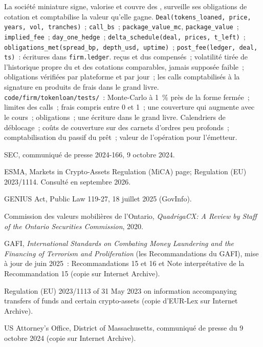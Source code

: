 \begin{build}
 La société miniature signe, valorise et couvre des , surveille ses obligations de cotation et comptabilise la valeur qu'elle gagne.
 \texttt{Deal(tokens\_loaned, price, years, vol, tranches)}~; \texttt{call\_bs}~; \texttt{package\_value\_mc}, \texttt{package\_value}~;
\texttt{implied\_fee}~; \texttt{day\_one\_hedge}~; \texttt{delta\_schedule(deal, prices, t\_left)}~; \texttt{obligations\_met(spread\_bp, depth\_usd, uptime)}~;
\texttt{post\_fee(ledger, deal, ts)}~: écritures dans \texttt{firm.ledger}.
  reçus et dus compensés~; volatilité tirée de l'historique propre du  et des cotations comparables, jamais supposée faible~; obligations vérifiées par plateforme
et par jour~; les calls comptabilisés à la signature en produits de frais dans le grand livre.
 \texttt{code/firm/tokenloan/tests/}~: Monte-Carlo à 1~\% près de la forme fermée~; limites des calls~; frais compris entre 0 et 1~; une couverture qui augmente avec le
cours~; obligations~; une écriture dans le grand livre.
 Calendriers de déblocage~; coûts de couverture sur des carnets d'ordres peu profonds~; comptabilisation du passif du prêt~; valeur de l'opération pour l'émetteur.
\end{build}

\begin{omsources}
\item SEC, communiqué de presse 2024-166, 9 octobre 2024.
\item ESMA, Markets in Crypto-Assets Regulation (MiCA) page; Regulation (EU) 2023/1114. Consulté en septembre 2026.
\item GENIUS Act, Public Law 119-27, 18 juillet 2025 (GovInfo).
\item Commission des valeurs mobilières de l'Ontario, \emph{QuadrigaCX: A Review by Staff of the Ontario Securities Commission}, 2020.
\item GAFI, \emph{International Standards on Combating Money Laundering and the Financing of Terrorism and Proliferation} (les Recommandations du GAFI),
mise à jour de juin 2025~: Recommandations 15 et 16 et Note interprétative de la Recommandation 15 (copie sur Internet Archive).
\item Regulation (EU) 2023/1113 of 31 May 2023 on information accompanying transfers of funds and certain crypto-assets (copie d'EUR-Lex sur Internet Archive).
\item US Attorney's Office, District of Massachusetts, communiqué de presse du 9 octobre 2024 (copie sur Internet Archive).
\end{omsources}

